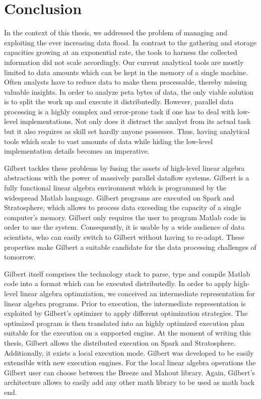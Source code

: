 \chapter{Conclusion}
\label{cha:conclusion}


In the context of this thesis, we addressed the problem of managing and exploiting the ever increasing data flood.
In contrast to the gathering and storage capacities growing at an exponential rate, the tools to harness the collected information did not scale accordingly.
Our current analytical tools are mostly limited to data amounts which can be kept in the memory of a single machine.
Often analysts have to reduce data to make them processable, thereby missing valuable insights.
In order to analyze peta bytes of data, the only viable solution is to split the work up and execute it distributedly.
However, parallel data processing is a highly complex and error-prone task if one has to deal with low-level implementations.
Not only does it distract the analyst from its actual task but it also requires as skill set hardly anyone possesses.
Thus, having analytical tools which scale to vast amounts of data while hiding the low-level implementation details becomes an imperative.

Gilbert tackles these problems by fusing the assets of high-level linear algebra abstractions with the power of massively parallel dataflow systems.
Gilbert is a fully functional linear algebra environment which is programmed by the widespread Matlab language.
Gilbert programs are executed on Spark and Stratosphere, which allows to process data exceeding the capacity of a single computer's memory.
Gilbert only requires the user to program Matlab code in order to use the system.
Consequently, it is usable by a wide audience of data scientists, who can easily switch to Gilbert without having to re-adapt.
These properties make Gilbert a suitable candidate for the data processing challenges of tomorrow.

Gilbert itself comprises the technology stack to parse, type and compile Matlab code into a format which can be executed distributedly.
In order to apply high-level linear algebra optimziation, we conceived an intermediate representation for linear algebra programs.
Prior to execution, the intermediate representation is exploited by Gilbert's optimizer to apply different optimization strategies.
The optimized program is then translated into an highly optimized execution plan suitable for the execution on a supported engine.
At the moment of writing this thesis, Gilbert allows the distributed execution on Spark and Stratosphere.
Additionally, it exists a local execution mode.
Gilbert was developed to be easily extensible with new execution engines.
For the local linear algebra operations the Gilbert user can choose between the Breeze and Mahout library.
Again, Gilbert's architecture allows to easily add any other math library to be used as math back end.

